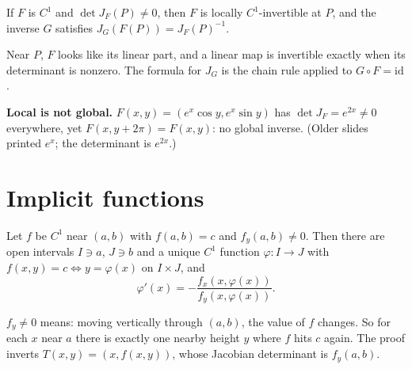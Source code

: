 \begin{thm}
If $F$ is $C^1$ and $\det J_F(P)\ne0$, then $F$ is locally $C^1$-invertible at $P$, and the
inverse $G$ satisfies $J_G(F(P))=J_F(P)^{-1}$.
\end{thm}

\begin{intuition}
Near $P$, $F$ looks like its linear part, and a linear map is invertible exactly when its
determinant is nonzero. The formula for $J_G$ is the chain rule applied to $G\circ F=\mathrm{id}$.
\end{intuition}

\begin{trap}
\textbf{Local is not global.} $F(x,y)=(e^x\cos y,e^x\sin y)$ has $\det J_F=e^{2x}\ne0$ everywhere,
yet $F(x,y+2\pi)=F(x,y)$: no global inverse. (Older slides printed $e^x$; the determinant is
$e^{2x}$.)
\end{trap}

\section{Implicit functions}

\begin{thm}
Let $f$ be $C^1$ near $(a,b)$ with $f(a,b)=c$ and $f_y(a,b)\ne0$. Then there are open intervals
$I\ni a$, $J\ni b$ and a unique $C^1$ function $\varphi:I\to J$ with
$f(x,y)=c\iff y=\varphi(x)$ on $I\times J$, and
\[ \varphi'(x)=-\frac{f_x(x,\varphi(x))}{f_y(x,\varphi(x))}. \]
\end{thm}

\begin{intuition}
$f_y\ne0$ means: moving vertically through $(a,b)$, the value of $f$ changes. So for each $x$
near $a$ there is exactly one nearby height $y$ where $f$ hits $c$ again. The proof inverts
$T(x,y)=(x,f(x,y))$, whose Jacobian determinant is $f_y(a,b)$.
\end{intuition}

\begin{center}
\end{center}


